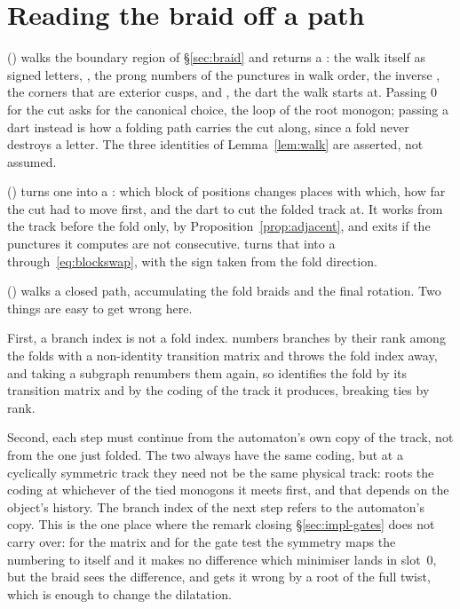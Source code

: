 \documentclass[12pt]{amsart}
\theoremstyle{plain}
\theoremstyle{definition}
\begin{document}
\section{Reading the braid off a path}
\label{sec:impl-braid}

 () walks the
boundary region of \S\ref{sec:braid} and returns a :
the walk itself as signed letters, , the prong
numbers of the punctures in walk order, the inverse ,
the corners that are exterior cusps, and , the dart the
walk starts at.  Passing $0$ for the cut asks for the canonical choice,
the loop of the root monogon; passing a dart instead is how a folding
path carries the cut along, since a fold never destroys a letter.  The
three identities of Lemma~\ref{lem:walk} are asserted, not assumed.

 () turns one
 into a : which block of positions
changes places with which, how far the cut had to move first, and the
dart to cut the folded track at.  It works from the track before the fold
only, by Proposition~\ref{prop:adjacent}, and exits if the punctures it
computes are not consecutive.   turns that into a
 through~\eqref{eq:blockswap}, with the sign taken from
the fold direction.

 () walks a
closed path, accumulating the fold braids and the final rotation.  Two
things are easy to get wrong here.

First, a branch index is not a fold index.   numbers
branches by their rank among the folds with a non-identity transition
matrix and throws the fold index away, and taking a subgraph renumbers
them again, so  identifies the fold by its
transition matrix and by the coding of the track it produces, breaking
ties by rank.

Second, each step must continue from the automaton's own copy of the
track, not from the one just folded.  The two always have the same
coding, but at a cyclically symmetric track they need not be the same
physical track:  roots the coding at whichever of
the tied monogons it meets first, and that depends on the object's
history.  The branch index of the next step refers to the automaton's
copy.  This is the one place where the remark closing
\S\ref{sec:impl-gates} does not carry over: for the matrix and for the
gate test the symmetry maps the numbering to itself and it makes no
difference which minimiser lands in slot~$0$, but the braid sees the
difference, and gets it wrong by a root of the full twist, which is
enough to change the dilatation.
\end{document}
